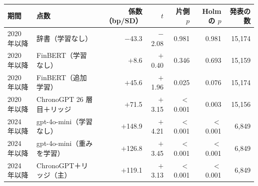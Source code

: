 \begin{tabular}{@{}llrrrrr@{}}
\toprule
期間 & 点数 & 係数（bp/SD） & $t$ & 片側 $p$ & Holm の $p$ & 発表の数 \\
\midrule
2020 年以降 & 辞書（学習なし） & $-$43.3 & $-$2.08 & 0.981 & 0.981 & 15,174 \\
2020 年以降 & FinBERT（学習なし） & $+$8.6 & $+$0.40 & 0.346 & 0.693 & 15,159 \\
2020 年以降 & FinBERT（追加学習） & $+$45.6 & $+$1.96 & 0.025 & 0.076 & 15,174 \\
2020 年以降 & ChronoGPT 26 層目＋リッジ & $+$71.5 & $+$3.15 & $<$0.001 & 0.003 & 15,156 \\
2024 年以降 & gpt-4o-mini（学習なし） & $+$148.9 & $+$4.21 & $<$0.001 & $<$0.001 & 6,849 \\
2024 年以降 & gpt-4o-mini（重みを学習） & $+$126.8 & $+$3.45 & $<$0.001 & $<$0.001 & 6,849 \\
2024 年以降 & ChronoGPT＋リッジ（主） & $+$119.1 & $+$3.13 & $<$0.001 & $<$0.001 & 6,849 \\
\bottomrule
\end{tabular}
